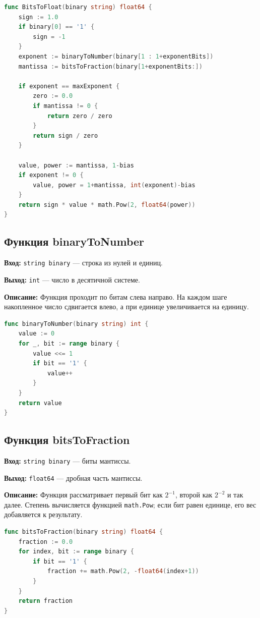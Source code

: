 \begin{lstlisting}[style=common, language=Go, caption=BitsToFloat, label=lst:bits-to-float]
func BitsToFloat(binary string) float64 {
    sign := 1.0
    if binary[0] == '1' {
        sign = -1
    }
    exponent := binaryToNumber(binary[1 : 1+exponentBits])
    mantissa := bitsToFraction(binary[1+exponentBits:])

    if exponent == maxExponent {
        zero := 0.0
        if mantissa != 0 {
            return zero / zero
        }
        return sign / zero
    }

    value, power := mantissa, 1-bias
    if exponent != 0 {
        value, power = 1+mantissa, int(exponent)-bias
    }
    return sign * value * math.Pow(2, float64(power))
}
\end{lstlisting}

\subsection*{Функция binaryToNumber}
\textbf{Вход:} \texttt{string binary} --- строка из нулей и единиц. \par
\textbf{Выход:} \texttt{int} --- число в десятичной системе. \par
\textbf{Описание:} Функция проходит по битам слева направо. На каждом шаге
накопленное число сдвигается влево, а при единице увеличивается на единицу.

\begin{lstlisting}[style=common, language=Go, caption=binaryToNumber, label=lst:binary-to-number]
func binaryToNumber(binary string) int {
    value := 0
    for _, bit := range binary {
        value <<= 1
        if bit == '1' {
            value++
        }
    }
    return value
}
\end{lstlisting}

\subsection*{Функция bitsToFraction}
\textbf{Вход:} \texttt{string binary} --- биты мантиссы. \par
\textbf{Выход:} \texttt{float64} --- дробная часть мантиссы. \par
\textbf{Описание:} Функция рассматривает первый бит как $2^{-1}$, второй как
$2^{-2}$ и так далее. Степень вычисляется функцией \texttt{math.Pow}; если
бит равен единице, его вес добавляется к результату.

\begin{lstlisting}[style=common, language=Go, caption=bitsToFraction, label=lst:bits-to-fraction]
func bitsToFraction(binary string) float64 {
    fraction := 0.0
    for index, bit := range binary {
        if bit == '1' {
            fraction += math.Pow(2, -float64(index+1))
        }
    }
    return fraction
}
\end{lstlisting}

\newpage
